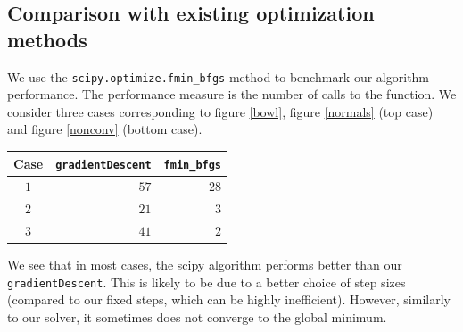 \subsection{Comparison with existing optimization methods}
\label{comparison}
We use the {\tt scipy.optimize.fmin\_bfgs} method to benchmark our algorithm performance. The performance measure is the number of calls to the function. 
We consider three cases corresponding to figure \ref{bowl}, figure \ref{normals} (top case) and figure \ref{nonconv} (bottom case).

\begin{center}
  \begin{tabular}{| c  | r |r |}
    \hline
 Case & {\tt gradientDescent} &  {\tt fmin\_bfgs}  \\ \hline
 $1$ & $57$  & $28$\\ \hline
 $2$ &    $ 21 $ &$3$ \\ \hline
 $3$ & $41$   &  $2$\\
    \hline
  \end{tabular}
\end{center}

We see that in most cases, the scipy algorithm performs better than our {\tt gradientDescent}. This is likely to be due to a better choice of step sizes (compared to our fixed steps, which can be highly inefficient). However, similarly to our solver, it sometimes does not converge to the global minimum.